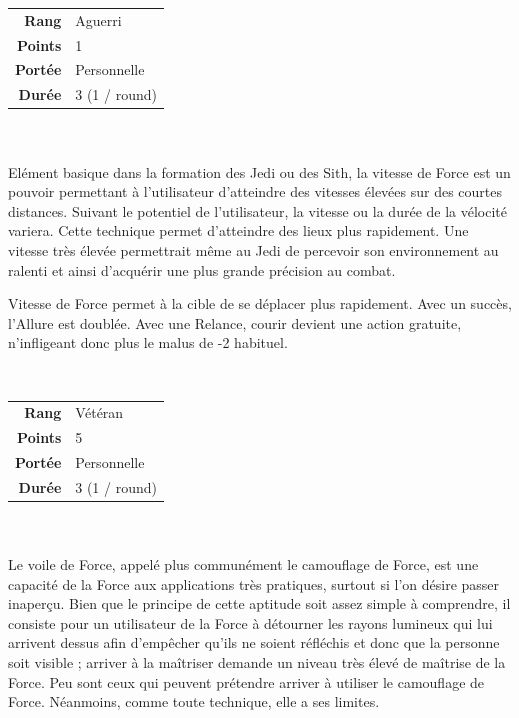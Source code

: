 \begin{description}[align=left]
        \begin{tabular}{ r l }
            \textbf{Rang}    & Aguerri \\
            \textbf{Points}  & 1 \\
            \textbf{Portée}  & Personnelle \\
            \textbf{Durée}   & 3 (1 / round) \\
        \end{tabular}
        \\ \\
        Elément basique dans la formation des Jedi ou des Sith, la vitesse de Force est un pouvoir permettant à l'utilisateur d'atteindre des vitesses élevées sur des courtes distances. Suivant le potentiel de l'utilisateur, la vitesse ou la durée de la vélocité variera. Cette technique permet d'atteindre des lieux plus rapidement. Une vitesse très élevée permettrait même au Jedi de percevoir son environnement au ralenti et ainsi d'acquérir une plus grande précision au combat.

        Vitesse de Force permet à la cible de se déplacer plus rapidement. Avec un succès, l’Allure est doublée. Avec une Relance, courir devient une action gratuite, n’infligeant donc plus le malus de -2 habituel. 
        \\

    \item [Vitesse de Force] ~ \\

        \begin{tabular}{ r l }
            \textbf{Rang}    & Vétéran \\
            \textbf{Points}  & 5 \\
            \textbf{Portée}  & Personnelle \\
            \textbf{Durée}   & 3 (1 / round) \\
        \end{tabular}
        \\ \\
        Le voile de Force, appelé plus communément le camouflage de Force, est une capacité de la Force aux applications très pratiques, surtout si l'on désire passer inaperçu. Bien que le principe de cette aptitude soit assez simple à comprendre, il consiste pour un utilisateur de la Force à détourner les rayons lumineux qui lui arrivent dessus afin d'empêcher qu'ils ne soient réfléchis et donc que la personne soit visible ; arriver à la maîtriser demande un niveau très élevé de maîtrise de la Force. Peu sont ceux qui peuvent prétendre arriver à utiliser le camouflage de Force. Néanmoins, comme toute technique, elle a ses limites.


\end{description}
